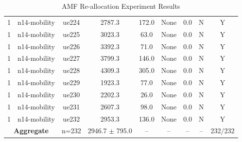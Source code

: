\begin{table}[ht]
\begin{tabular}{|c|c|c|c|c|c|c|c|c|}
1 & n14-mobility & ue224 & 2787.3 & 172.0 & None & 0.0 & N & Y \\
1 & n14-mobility & ue225 & 3023.3 & 63.0 & None & 0.0 & N & Y \\
1 & n14-mobility & ue226 & 3392.3 & 71.0 & None & 0.0 & N & Y \\
1 & n14-mobility & ue227 & 3799.3 & 146.0 & None & 0.0 & N & Y \\
1 & n14-mobility & ue228 & 4309.3 & 305.0 & None & 0.0 & N & Y \\
1 & n14-mobility & ue229 & 1923.3 & 77.0 & None & 0.0 & N & Y \\
1 & n14-mobility & ue230 & 2202.3 & 26.0 & None & 0.0 & N & Y \\
1 & n14-mobility & ue231 & 2607.3 & 98.0 & None & 0.0 & N & Y \\
1 & n14-mobility & ue232 & 2953.3 & 136.0 & None & 0.0 & N & Y \\
\multicolumn{2}{|c|}{\textbf{Aggregate}} & n=232 & 2946.7 $\pm$ 795.0 & -- & -- & -- & -- & 232/232 \\
\hline
\end{tabular}
\caption{AMF Re-allocation Experiment Results}
\label{tab:amf_realloc}
\end{table}
